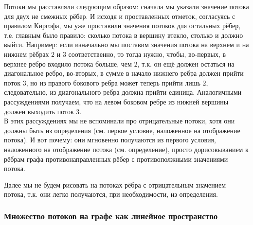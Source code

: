 Потоки мы расставляли следующим образом: сначала мы указали значение потока 
для двух не смежных рёбер. И исходя и проставленных отметок, согласуясь с 
правилом Киргофа, мы уже проставили значения потоков для остальных рёбер, т.е. 
главным было правило: сколько потока в вершину втекло, столько и должно выйти.
Например: если изначально мы поставим значения потока на верхнем и на нижнем 
рёбрах $2$ и $3$ соответственно, то тогда нужно, чтобы, во-первых, в верхнее 
ребро входило потока больше, чем $2$, т.к. он ещё должен остаться на 
диагональное ребро, во-вторых, в сумме в начало нижнего ребра должен прийти 
поток $3$, но из правого бокового ребра может теперь прийти лишь $2$, следовательно,
из диагонального ребра должна прийти единица. Аналогичными рассуждениями 
получаем, что на левом боковом ребре из нижней вершины должен выходить 
поток $3$.\\
В этих рассуждениях мы не вспоминали про отрицательные потоки, хотя они должны 
быть из определения (см. первое условие, наложенное на отображение потока).  
И вот почему: они мгновенно получаются из первого условия, наложенного на отображение потока (см. 
определение), просто дорисовыванием к рёбрам графа противонаправленных рёбер 
с противополжными значениями потока.


\begin{notice}
    Далее мы не будем рисовать на потоках рёбра с отрицательным значением потока, 
    т.к. они легко получаются, при необходимости, из определения.
\end{notice}

\subsubsection{Множество потоков на графе как линейное пространство}

